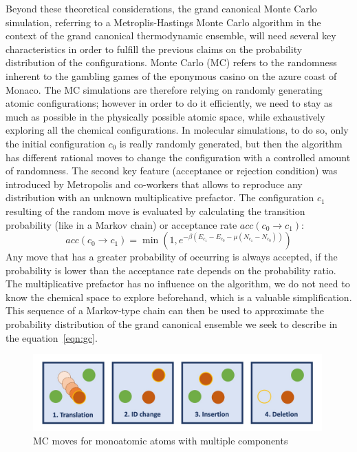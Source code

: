 \documentclass[main.tex]{subfiles}
\begin{document}
Beyond these theoretical considerations, the grand canonical Monte Carlo simulation, referring to a Metroplis-Hastings Monte Carlo algorithm in the context of the grand canonical thermodynamic ensemble, will need several key characteristics in order to fulfill the previous claims on the probability distribution of the configurations. Monte Carlo (MC) refers to the randomness inherent to the gambling games of the eponymous casino on the azure coast of Monaco. The MC simulations are therefore relying on randomly generating atomic configurations; however in order to do it efficiently, we need to stay as much as possible in the physically possible atomic space, while exhaustively exploring all the chemical configurations. 
In molecular simulations, to do so, only the initial configuration $c_0$ is really randomly generated, but then the algorithm has different rational moves to change the configuration with a controlled amount of randomness. The second key feature (acceptance or rejection condition) was introduced by Metropolis and co-workers that allows to reproduce any distribution with an unknown multiplicative prefactor.\cite{Metropolis1949} The configuration $c_1$ resulting of the random move is evaluated by calculating the transition probability (like in a Markov chain) or acceptance rate $acc(c_0 \rightarrow c_1)$: 
\begin{equation}
  acc(c_0 \rightarrow c_1) = \min\left(1, e^{-\beta\left(E_{c_1}-E_{c_0}-\mu \left(N_{c_1}-N_{c_0}\right)\right) }\right)
\end{equation}
Any move that has a greater probability of occurring is always accepted, if the probability is lower than the acceptance rate depends on the probability ratio.
The multiplicative prefactor has no influence on the algorithm, we do not need to know the chemical space to explore beforehand, which is a valuable simplification. This sequence of a Markov-type chain can then be used to approximate the probability distribution of the grand canonical ensemble we seek to describe in the equation~\ref{eqn:gc}.


\begin{figure}[ht]
  \centering
  \includegraphics[width=0.99\textwidth]{figures/2-thermo/MC_moves.jpg}
  \caption{MC moves for monoatomic atoms with multiple components}\label{fgr:mc}
\end{figure}
\end{document}
